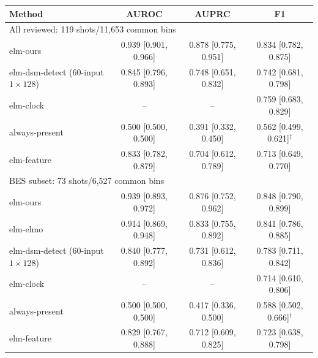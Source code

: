 \begin{table}[t]
\centering
\small
\begin{tabular}{lccc}
\toprule
Method & AUROC & AUPRC & F1 \\
\midrule
\multicolumn{4}{l}{All reviewed: 119 shots/11,653 common bins} \\
elm-ours & 0.939 {\scriptsize[0.901, 0.966]} & 0.878 {\scriptsize[0.775, 0.951]} & 0.834 {\scriptsize[0.782, 0.875]} \\
elm-dsm-detect (60-input $1\times128$) & 0.845 {\scriptsize[0.796, 0.893]} & 0.748 {\scriptsize[0.651, 0.832]} & 0.742 {\scriptsize[0.681, 0.798]} \\
elm-clock & -- & -- & 0.759 {\scriptsize[0.683, 0.829]} \\
always-present & 0.500 {\scriptsize[0.500, 0.500]} & 0.391 {\scriptsize[0.332, 0.450]} & 0.562 {\scriptsize[0.499, 0.621]}$^{\dagger}$ \\
elm-feature & 0.833 {\scriptsize[0.782, 0.879]} & 0.704 {\scriptsize[0.612, 0.789]} & 0.713 {\scriptsize[0.649, 0.770]} \\
\midrule
\multicolumn{4}{l}{BES subset: 73 shots/6,527 common bins} \\
elm-ours & 0.939 {\scriptsize[0.893, 0.972]} & 0.876 {\scriptsize[0.752, 0.962]} & 0.848 {\scriptsize[0.790, 0.899]} \\
elm-elmo & 0.914 {\scriptsize[0.869, 0.948]} & 0.833 {\scriptsize[0.755, 0.892]} & 0.841 {\scriptsize[0.786, 0.885]} \\
elm-dsm-detect (60-input $1\times128$) & 0.840 {\scriptsize[0.777, 0.892]} & 0.731 {\scriptsize[0.612, 0.836]} & 0.783 {\scriptsize[0.711, 0.842]} \\
elm-clock & -- & -- & 0.714 {\scriptsize[0.610, 0.806]} \\
always-present & 0.500 {\scriptsize[0.500, 0.500]} & 0.417 {\scriptsize[0.336, 0.500]} & 0.588 {\scriptsize[0.502, 0.666]}$^{\dagger}$ \\
elm-feature & 0.829 {\scriptsize[0.767, 0.888]} & 0.712 {\scriptsize[0.609, 0.825]} & 0.723 {\scriptsize[0.638, 0.798]} \\
\bottomrule

\end{tabular}
\end{table}
